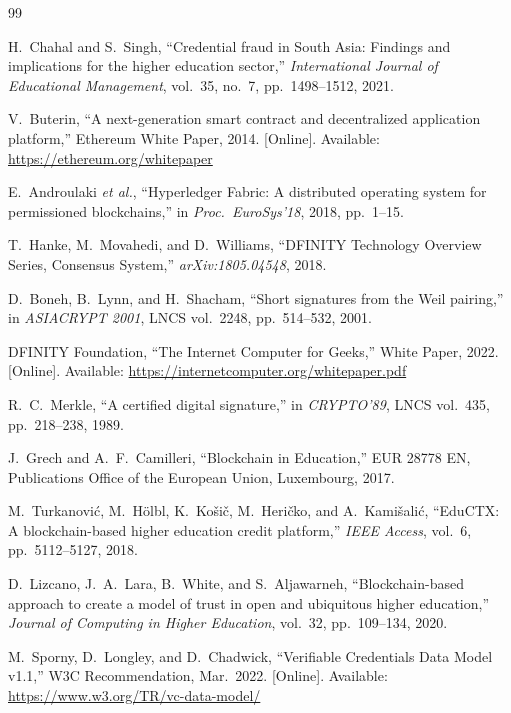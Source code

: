 \documentclass[journal]{IEEEtran}
\begin{document}
\balance
\begin{thebibliography}{99}

H.~Chahal and S.~Singh,
``Credential fraud in South Asia: Findings and implications for the higher education sector,''
\textit{International Journal of Educational Management}, vol.~35, no.~7, pp.~1498--1512, 2021.

V.~Buterin,
``A next-generation smart contract and decentralized application platform,''
Ethereum White Paper, 2014.
[Online]. Available: \url{https://ethereum.org/whitepaper}

E.~Androulaki \textit{et al.},
``Hyperledger Fabric: A distributed operating system for permissioned blockchains,''
in \textit{Proc.\ EuroSys'18}, 2018, pp.~1--15.

T.~Hanke, M.~Movahedi, and D.~Williams,
``DFINITY Technology Overview Series, Consensus System,''
\textit{arXiv:1805.04548}, 2018.

D.~Boneh, B.~Lynn, and H.~Shacham,
``Short signatures from the Weil pairing,''
in \textit{ASIACRYPT 2001}, LNCS vol.~2248, pp.~514--532, 2001.

DFINITY Foundation,
``The Internet Computer for Geeks,''
White Paper, 2022.
[Online]. Available: \url{https://internetcomputer.org/whitepaper.pdf}

R.~C.~Merkle,
``A certified digital signature,''
in \textit{CRYPTO'89}, LNCS vol.~435, pp.~218--238, 1989.

J.~Grech and A.~F.~Camilleri,
``Blockchain in Education,''
EUR 28778 EN, Publications Office of the European Union, Luxembourg, 2017.

M.~Turkanovi\'{c}, M.~H\"{o}lbl, K.~Ko\v{s}i\v{c}, M.~Heri\v{c}ko, and A.~Kami\v{s}ali\'{c},
``EduCTX: A blockchain-based higher education credit platform,''
\textit{IEEE Access}, vol.~6, pp.~5112--5127, 2018.

D.~Lizcano, J.~A.~Lara, B.~White, and S.~Aljawarneh,
``Blockchain-based approach to create a model of trust in open and ubiquitous higher education,''
\textit{Journal of Computing in Higher Education}, vol.~32, pp.~109--134, 2020.

M.~Sporny, D.~Longley, and D.~Chadwick,
``Verifiable Credentials Data Model v1.1,''
W3C Recommendation, Mar.~2022.
[Online]. Available: \url{https://www.w3.org/TR/vc-data-model/}


\end{thebibliography}
\end{document}
